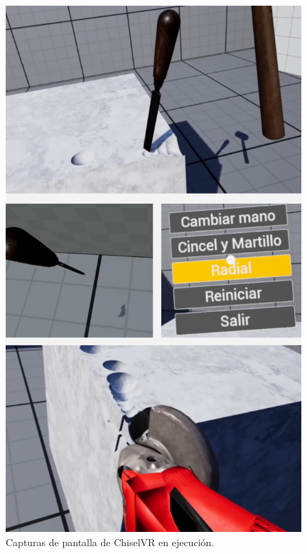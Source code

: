 \begin{figure}[H]
	\centering
	\includegraphics[width=11cm]{imagenes/screenshots}
	\caption{Capturas de pantalla de ChiselVR en ejecución.}
	\label{fig:screenshots}
\end{figure}